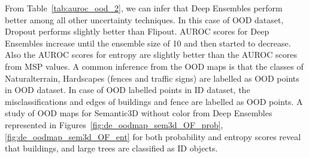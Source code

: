     From Table~\ref{tab:auroc_ood_2}, we can infer that Deep Ensembles perform better among all other uncertainty techniques.
    In this case of OOD dataset, Dropout performs slightly better than Flipout.
    AUROC scores for Deep Ensembles increase until the ensemble size of 10 and then started to decrease.
    Also the AUROC scores for entropy are slightly better than the AUROC scores from MSP values.
    A common inference from the OOD maps is that the classes of Naturalterrain, Hardscapes (fences and traffic signs) are labelled as OOD points in OOD dataset.
    In case of OOD labelled points in ID dataset, the misclassifications and edges of buildings and fence are labelled as OOD points.
    A study of OOD maps for Semantic3D without color from Deep Ensembles represented in Figures~\ref{fig:de_oodmap_sem3d_OF_prob}, \ref{fig:de_oodmap_sem3d_OF_ent} for both probability and entropy scores reveal that buildings, and large trees are classified as ID objects.
